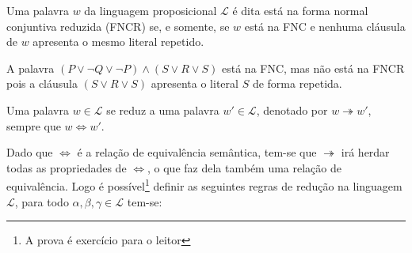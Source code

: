 \begin{definicao}\label{def:ReduzedConjuntiveNormalForm}
  Uma palavra $w$ da linguagem proposicional $\mathcal{L}$ é dita está na forma normal conjuntiva reduzida (FNCR) se, e somente, se $w$ está na FNC e nenhuma cláusula de $w$ apresenta o mesmo literal repetido.
\end{definicao}

\begin{exemplo}
  A palavra $(P \lor \neg Q \lor \neg P) \land (S \lor R \lor S)$ está na FNC, mas não está na FNCR pois a cláusula $(S \lor R \lor S)$ apresenta o literal $S$ de forma repetida.
\end{exemplo}

\begin{definicao}
  Uma palavra $w \in \mathcal{L}$ se reduz a uma palavra $w' \in \mathcal{L}$, denotado por $w \twoheadrightarrow  w'$, sempre que $w \Leftrightarrow w'$.
\end{definicao}

Dado que $\Leftrightarrow$ é a relação de equivalência semântica, tem-se que $\twoheadrightarrow$ irá herdar todas as propriedades de $\Leftrightarrow$, o que faz dela também uma relação de equivalência. Logo é possível\footnote{A prova é exercício para o leitor} definir as seguintes regras de redução na linguagem $\mathcal{L}$, para todo $\alpha, \beta, \gamma \in \mathcal{L}$ tem-se:

